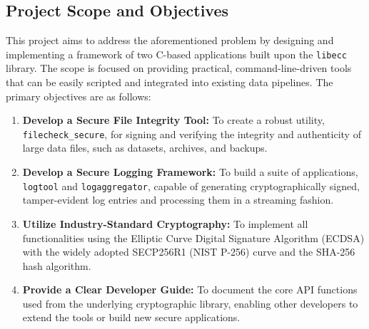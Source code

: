 \documentclass[12pt, letterpaper]{article}
\begin{document}
	\subsection{Project Scope and Objectives}
	This project aims to address the aforementioned problem by designing and implementing a framework of two C-based applications built upon the \texttt{libecc} library. The scope is focused on providing practical, command-line-driven tools that can be easily scripted and integrated into existing data pipelines. The primary objectives are as follows:
	\begin{enumerate}
		\item \textbf{Develop a Secure File Integrity Tool:} To create a robust utility, \texttt{filecheck\_secure}, for signing and verifying the integrity and authenticity of large data files, such as datasets, archives, and backups.
		\item \textbf{Develop a Secure Logging Framework:} To build a suite of applications, \texttt{logtool} and \texttt{logaggregator}, capable of generating cryptographically signed, tamper-evident log entries and processing them in a streaming fashion.
		\item \textbf{Utilize Industry-Standard Cryptography:} To implement all functionalities using the Elliptic Curve Digital Signature Algorithm (ECDSA) with the widely adopted SECP256R1 (NIST P-256) curve and the SHA-256 hash algorithm.
		\item \textbf{Provide a Clear Developer Guide:} To document the core API functions used from the underlying cryptographic library, enabling other developers to extend the tools or build new secure applications.
	\end{enumerate}
	
\end{document}
